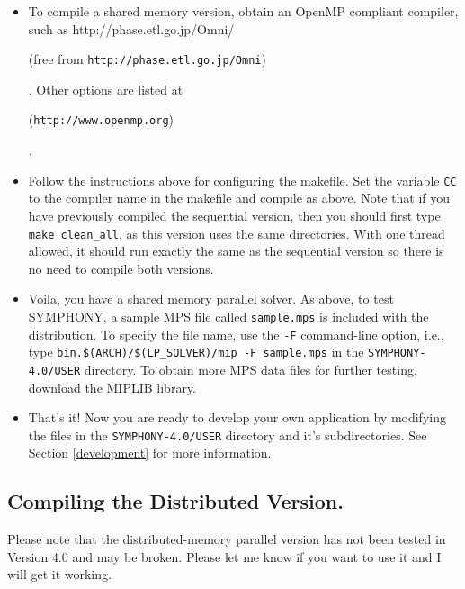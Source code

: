 \begin{itemize}
        \item To compile a shared memory version, obtain an OpenMP
        compliant compiler, such as 
        {http://phase.etl.go.jp/Omni/}
\begin{latexonly} 
        (free from {\tt http://phase.etl.go.jp/Omni})
\end{latexonly}. 
        Other options are listed at 
\begin{latexonly}
        ({\tt http://www.openmp.org})
\end{latexonly}.

        \item Follow the instructions above for configuring the makefile. Set
the variable {\tt CC} to the compiler name in the makefile and compile as
above. Note that if you have previously compiled the sequential version, then
you should first type {\tt make clean\_all}, as this version uses the same
directories.  With one thread allowed, it should run exactly the same as the
sequential version so there is no need to compile both versions.

        \item Voila, you have a shared memory parallel solver. As above, to
test SYMPHONY, a sample MPS file called \texttt{sample.mps} is included with the
distribution. To specify the file name, use the \texttt{-F} command-line option,
i.e., type \texttt{bin.\$(ARCH)/\$(LP\_SOLVER)/mip -F sample.mps} in the
\texttt{SYMPHONY-4.0/USER} directory. To obtain more MPS data files for further
testing, download the MIPLIB library.

\item That's it! Now you are ready to develop your own application by modifying
the files in the \texttt{SYMPHONY-4.0/USER} directory and it's
subdirectories. See Section \ref{development} for more information.

\end{itemize}

\subsection{Compiling the Distributed Version.}

Please note that the distributed-memory parallel version has not been tested
in Version 4.0 and may be broken. Please let me know if you want to use it and
I will get it working.

